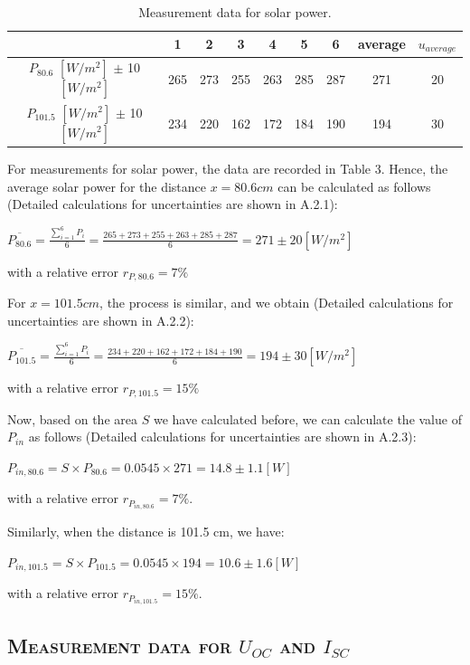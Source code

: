 \documentclass[a4paper,12pt]{article}
\begin{document}
\begin{table}[H]
\begin{center}
\begin{tabular}{|c|c|c|c|c|c|c|c|c|}
\hline
 & 1 & 2 & 3 & 4 & 5 & 6 & average & $u_{average}$ \\ \hline
$P_{80.6}$ $[W/m^2]$ $\pm$ 10 $[W/m^2]$ & 265 & 273 & 255 & 263 & 285 & 287 & 271 & 20 \\ \hline
$P_{101.5}$ $[W/m^2]$ $\pm$ 10 $[W/m^2]$ & 234 & 220 & 162 & 172 & 184 & 190 & 194 & 30 \\ \hline
\end{tabular}
\caption{Measurement data for solar power.}
\end{center}
\end{table}
For measurements for solar power, the data are recorded in Table 3. Hence, the average solar power for the distance $x = 80.6 cm$ can be calculated as follows (Detailed calculations for uncertainties are shown in A.2.1):
\begin{center}
$ \displaystyle \overline{P_{80.6}} = \frac{\sum_{i=1}^6P_i}{6} = \frac{265 + 273 + 255 + 263 + 285 + 287}{6} = 271 \pm 20 [W/m^2] $
\end{center}
with a relative error $r_{P,80.6} = 7\%$
\par For $x = 101.5 cm$, the process is similar, and we obtain (Detailed calculations for uncertainties are shown in A.2.2):
\begin{center}
$ \displaystyle \overline{P_{101.5}} = \frac{\sum_{i=1}^6P_i}{6} = \frac{234 + 220 + 162 + 172 + 184 + 190}{6} = 194 \pm 30 [W/m^2] $
\end{center}
with a relative error $r_{P,101.5} = 15\%$
\par Now, based on the area $S$ we have calculated before, we can calculate the value of $P_{in}$ as follows (Detailed calculations for uncertainties are shown in A.2.3):
\begin{center}
$P_{in,80.6} = S \times P_{80.6} = 0.0545 \times 271 =  14.8 \pm 1.1 [W] $
\end{center}
with a relative error $r_{P_{in,80.6}} = 7\%$.
\par Similarly, when the distance is 101.5 cm, we have:
\begin{center}
$P_{in,101.5} = S \times P_{101.5} = 0.0545 \times 194 =  10.6 \pm 1.6 [W] $
\end{center}
with a relative error $r_{P_{in,101.5}} = 15\%$.


\subsection{\textsc{Measurement data for $U_{OC}$ and $I_{SC}$}}
\end{document}
